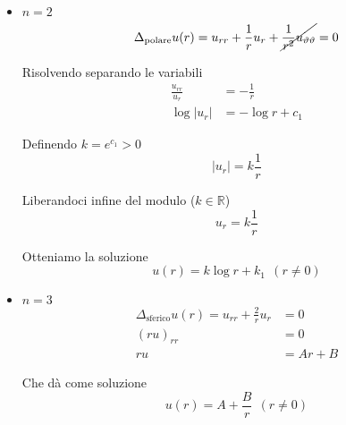 \begin{itemize}
    \item $n=2$
          \begin{equation*}
              \Delta _{\text{polare}} u(r) =u_{rr} +\frac{1}{r} u_{r} +\cancel{\frac{1}{r^{2}} u_{\vartheta \vartheta }} =0
          \end{equation*}

          Risolvendo separando le variabili
          \begin{align*}
              \frac{u_{rr}}{u_{r}} & =-\frac{1}{r}  \\
              \log| u_{r}|         & =-\log r+c_{1}
          \end{align*}

          Definendo $\displaystyle k=e^{c_{1}}  >0$
          \begin{equation*}
              | u_{r}| =k\frac{1}{r}
          \end{equation*}

          Liberandoci infine del modulo ($\displaystyle k\in \mathbb{R}$)
          \begin{equation*}
              u_{r} =k\frac{1}{r}
          \end{equation*}

          Otteniamo la soluzione
          \begin{equation*}
              \boxed{u(r) =k\log r+k_{1}} \ \ (r\neq 0)
          \end{equation*}
    \item $n=3$
          \begin{align*}
              \Delta _{\text{sferico}} u(r) =u_{rr} +\frac{2}{r} u_{r} & =0    \\
              (ru)_{rr}                                                & =0    \\
              ru                                                       & =Ar+B
          \end{align*}

          Che dà come soluzione
          \begin{equation*}
              \boxed{u(r) =A+\frac{B}{r}} \ \ (r\neq 0)
          \end{equation*}
\end{itemize}

